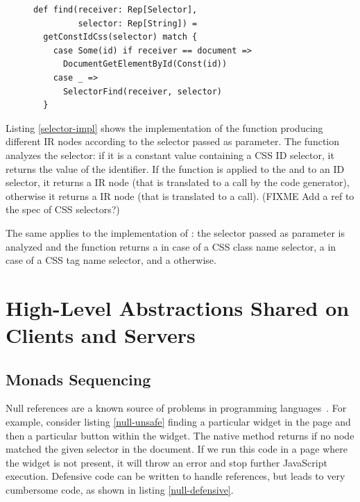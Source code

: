 \documentclass[preprint]{sigplanconf}
\begin{document}
\begin{figure}
\begin{lstlisting}[label=selector-impl,caption=Selectors optimization]
def find(receiver: Rep[Selector],
         selector: Rep[String]) =
  getConstIdCss(selector) match {
    case Some(id) if receiver == document =>
      DocumentGetElementById(Const(id))
    case _ =>
      SelectorFind(receiver, selector)
  }
\end{lstlisting}
\end{figure}

Listing \ref{selector-impl} shows the implementation of the  function producing different IR nodes
according to the selector passed as parameter. The  function analyzes the selector: if it
is a constant  value containing a CSS ID selector, it returns the value of the identifier. If the
 function is applied to the  and to an ID selector, it returns a
 IR node (that is translated to a  call by the code
generator), otherwise it returns a  IR node (that is translated to a 
call). (FIXME Add a ref to the spec of CSS selectors?)

The same applies to the implementation of : the selector passed as parameter is analyzed and the
function returns a  in case of a CSS class name selector, a
 in case of a CSS tag name selector, and a  otherwise.


\section{High-Level Abstractions Shared on Clients and Servers}
\label{contribution-shared}

\subsection{Monads Sequencing}

Null references are a known source of problems in programming languages~\cite{Hoare09_Null,Nanda09_Null}. For
example, consider listing \ref{null-unsafe} finding a particular widget in the page and then a particular
button within the widget. The native  method returns  if no node matched the given
selector in the document. If we run this code in a page where the widget is not present, it will throw an error
and stop further JavaScript execution. Defensive code can be written to handle  references, but leads to
very cumbersome code, as shown in listing \ref{null-defensive}.
\end{document}
